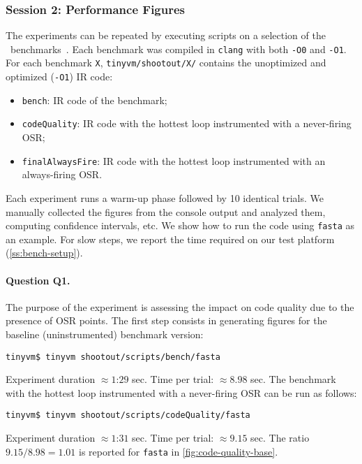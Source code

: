 
\subsubsection{Session 2: Performance Figures}

The experiments can be repeated by executing scripts on a selection of the \shootout\ benchmarks~\cite{shootout}. Each benchmark was compiled in {\tt clang} with both {\tt -O0} and {\tt -O1}. For each benchmark {\tt X}, {\tt tinyvm/shootout/X/} contains the unoptimized and optimized ({\tt -O1}) IR code:

\begin{itemize}[parsep=0pt]
\item {\tt bench}: IR code of the benchmark;
\item {\tt codeQuality}: IR code with the hottest loop instrumented with a never-firing OSR;
\item {\tt finalAlwaysFire}: IR code with the hottest loop instrumented with an always-firing OSR.
\end{itemize}

\noindent Each experiment runs a warm-up phase followed by 10 identical trials. We manually collected the figures from the console output and analyzed them, computing confidence intervals, etc. We show how to run the code using {\tt fasta} as an example. For slow steps, we report the time required on our test platform (\mysection\ref{ss:bench-setup}).

\paragraph{Question Q1.} The purpose of the experiment is assessing the impact on code quality due to the presence of OSR points.
The first step consists in generating figures for the baseline (uninstrumented) benchmark version:
\begin{small}
\begin{verbatim}
tinyvm$ tinyvm shootout/scripts/bench/fasta
\end{verbatim}
\end{small}

\noindent Experiment duration $\approx1$:$29$ sec. Time per trial: $\approx8.98$ sec. The benchmark with the hottest loop instrumented with a never-firing OSR can be run as follows:

\begin{small}
\begin{verbatim}
tinyvm$ tinyvm shootout/scripts/codeQuality/fasta
\end{verbatim}
\end{small}

\noindent Experiment duration $\approx1$:$31$ sec. Time per trial: $\approx9.15$ sec. The ratio $9.15/8.98=1.01$ is reported for {\tt fasta} in \ref{fig:code-quality-base}.


